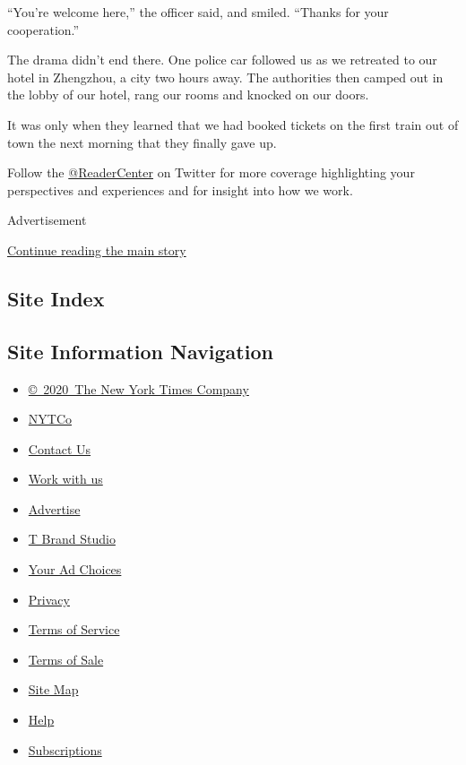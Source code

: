 ``You're welcome here,'' the officer said, and smiled. ``Thanks for your
cooperation.''

The drama didn't end there. One police car followed us as we retreated
to our hotel in Zhengzhou, a city two hours away. The authorities then
camped out in the lobby of our hotel, rang our rooms and knocked on our
doors.

It was only when they learned that we had booked tickets on the first
train out of town the next morning that they finally gave up.

Follow the \href{https://twitter.com/readercenter}{@ReaderCenter} on
Twitter for more coverage highlighting your perspectives and experiences
and for insight into how we work.

Advertisement

\protect\hyperlink{after-bottom}{Continue reading the main story}

\hypertarget{site-index}{%
\subsection{Site Index}\label{site-index}}

\hypertarget{site-information-navigation}{%
\subsection{Site Information
Navigation}\label{site-information-navigation}}

\begin{itemize}
\tightlist
\item
  \href{https://help.nytimes.com/hc/en-us/articles/115014792127-Copyright-notice}{©~2020~The
  New York Times Company}
\end{itemize}

\begin{itemize}
\tightlist
\item
  \href{https://www.nytco.com/}{NYTCo}
\item
  \href{https://help.nytimes.com/hc/en-us/articles/115015385887-Contact-Us}{Contact
  Us}
\item
  \href{https://www.nytco.com/careers/}{Work with us}
\item
  \href{https://nytmediakit.com/}{Advertise}
\item
  \href{http://www.tbrandstudio.com/}{T Brand Studio}
\item
  \href{https://www.nytimes.com/privacy/cookie-policy\#how-do-i-manage-trackers}{Your
  Ad Choices}
\item
  \href{https://www.nytimes.com/privacy}{Privacy}
\item
  \href{https://help.nytimes.com/hc/en-us/articles/115014893428-Terms-of-service}{Terms
  of Service}
\item
  \href{https://help.nytimes.com/hc/en-us/articles/115014893968-Terms-of-sale}{Terms
  of Sale}
\item
  \href{https://spiderbites.nytimes.com}{Site Map}
\item
  \href{https://help.nytimes.com/hc/en-us}{Help}
\item
  \href{https://www.nytimes.com/subscription?campaignId=37WXW}{Subscriptions}
\end{itemize}
